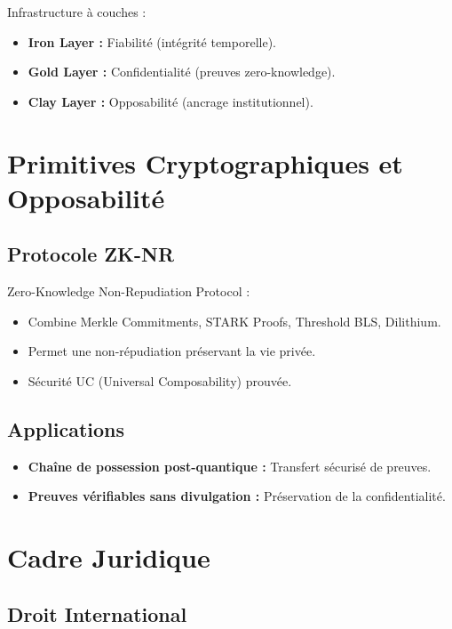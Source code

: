 \documentclass[12pt]{article}
\begin{document}
Infrastructure à couches :
\begin{itemize}
    \item \textbf{Iron Layer :} Fiabilité (intégrité temporelle).
    \item \textbf{Gold Layer :} Confidentialité (preuves zero-knowledge).
    \item \textbf{Clay Layer :} Opposabilité (ancrage institutionnel).
\end{itemize}

\section{Primitives Cryptographiques et Opposabilité}

\subsection{Protocole ZK-NR}

Zero-Knowledge Non-Repudiation Protocol :
\begin{itemize}
    \item Combine Merkle Commitments, STARK Proofs, Threshold BLS, Dilithium.
    \item Permet une non-répudiation préservant la vie privée.
    \item Sécurité UC (Universal Composability) prouvée.
\end{itemize}

\subsection{Applications}

\begin{itemize}
    \item \textbf{Chaîne de possession post-quantique :} Transfert sécurisé de preuves.
    \item \textbf{Preuves vérifiables sans divulgation :} Préservation de la confidentialité.
\end{itemize}

\section{Cadre Juridique}

\subsection{Droit International}
\end{document}
